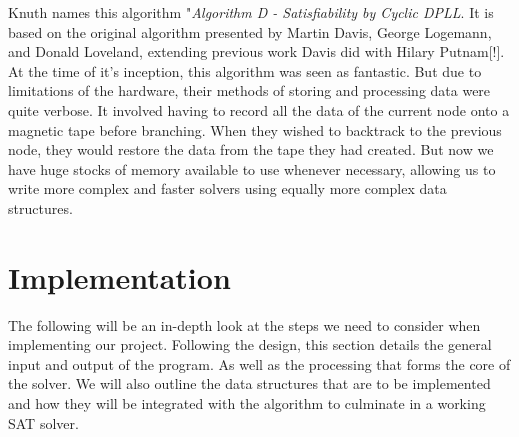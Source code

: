 \documentclass{article}
\begin{document}
Knuth names this algorithm "\textit{Algorithm D - Satisfiability by Cyclic DPLL}. It is based on the
original algorithm presented by Martin Davis, George Logemann, and Donald Loveland\cite{dpll},
extending previous work Davis did with Hilary Putnam[!]. At the time of it's inception, this
algorithm was seen as fantastic. But due to limitations of the hardware, their methods of storing
and processing data were quite verbose. It involved having to record all the data of the current
node onto a magnetic tape before branching. When they wished to backtrack to the previous node,
they would restore the data from the tape they had created. But now we have huge stocks of memory
available to use whenever necessary, allowing us to write more complex and faster solvers using
equally more complex data structures. 



\section{Implementation}

The following will be an in-depth look at the steps we need to consider when implementing our
project. Following the design, this section details the general input and output of the program. As
well as the processing that forms the core of the solver. We will also outline the data structures
that are to be implemented and how they will be integrated with the algorithm to culminate in a
working SAT solver.
\end{document}
